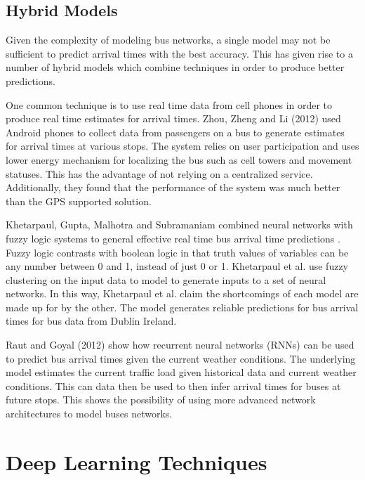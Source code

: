 \subsection{Hybrid Models}

Given the complexity of modeling bus networks, a single model may not be sufficient to predict arrival times with the best accuracy.
This has given rise to a number of hybrid models which combine techniques in order to produce better predictions.

One common technique is to use real time data from cell phones in order to produce real time estimates for arrival times.
Zhou, Zheng and Li (2012) used Android phones to collect data from passengers on a bus to generate estimates for arrival times at various stops\cite{zhou2012long}.
The system relies on user participation and uses lower energy mechanism for localizing the bus such as cell towers and movement statuses.
This has the advantage of not relying on a centralized service.
Additionally, they found that the performance of the system was much better than the GPS supported solution.

Khetarpaul, Gupta, Malhotra and Subramaniam combined neural networks with fuzzy logic systems to general effective real time bus arrival time predictions \cite{khetarpaul2015bus}.
Fuzzy logic contrasts with boolean logic in that truth values of variables can be any number between 0 and 1, instead of just 0 or 1.
Khetarpaul et al. use fuzzy clustering on the input data to model to generate inputs to a set of neural networks.
In this way, Khetarpaul et al. claim the shortcomings of each model are made up for by the other.
The model generates reliable predictions for bus arrival times for bus data from Dublin Ireland.

Raut and Goyal (2012) show how recurrent neural networks (RNNs) can be used to predict bus arrival times given the current weather conditions\cite{raut2012public}.
The underlying model estimates the current traffic load given historical data and current weather conditions.
This can data then be used to then infer arrival times for buses at future stops.
This shows the possibility of using more advanced network architectures to model buses networks.

\section{Deep Learning Techniques}

